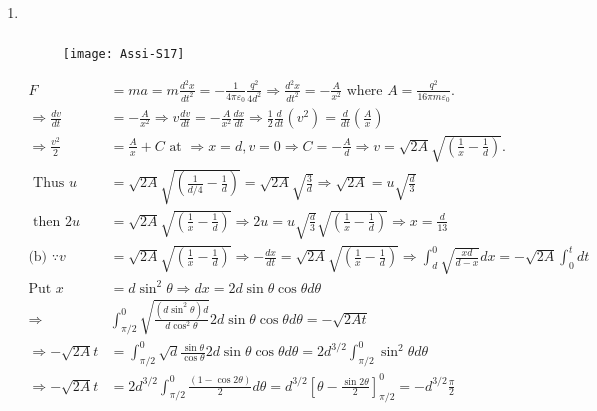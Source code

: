 \begin{enumerate}
\begin{answer}
	\end{answer}
	\item $\left. \right. $
	\begin{answer}$\left. \right. $
			\begin{figure}[H]
			\centering
			\texttt{[image: Assi-S17]}
		\end{figure}
		\begin{align*}
	F&=m a=m \frac{d^{2} x}{d t^{2}}=-\frac{1}{4 \pi \varepsilon_{0}} \frac{q^{2}}{4 d^{2}} \Rightarrow \frac{d^{2} x}{d t^{2}}=-\frac{A}{x^{2}}\text{ where }A=\frac{q^{2}}{16 \pi m \varepsilon_{0}}.\\
		\Rightarrow \frac{d v}{d t}&=-\frac{A}{x^{2}} \Rightarrow v \frac{d v}{d t}=-\frac{A}{x^{2}} \frac{d x}{d t} \Rightarrow \frac{1}{2} \frac{d}{d t}\left(v^{2}\right)=\frac{d}{d t}\left(\frac{A}{x}\right) \\
		\Rightarrow \frac{v^{2}}{2}&=\frac{A}{x}+C \text { at } \Rightarrow x=d, v=0 \Rightarrow C=-\frac{A}{d} \Rightarrow v=\sqrt{2 A} \sqrt{\left(\frac{1}{x}-\frac{1}{d}\right)} . \\
		\text { Thus } u&=\sqrt{2 A} \sqrt{\left(\frac{1}{d / 4}-\frac{1}{d}\right)}=\sqrt{2 A} \sqrt{\frac{3}{d}} \Rightarrow \sqrt{2 A}=u \sqrt{\frac{d}{3}} \\
		\text { then } 2 u&=\sqrt{2 A} \sqrt{\left(\frac{1}{x}-\frac{1}{d}\right)} \Rightarrow 2 u=u \sqrt{\frac{d}{3}} \sqrt{\left(\frac{1}{x}-\frac{1}{d}\right)} \Rightarrow x=\frac{d}{13}\\
		\text{(b) }\because v&=\sqrt{2 A} \sqrt{\left(\frac{1}{x}-\frac{1}{d}\right)} \Rightarrow-\frac{d x}{d t}=\sqrt{2 A} \sqrt{\left(\frac{1}{x}-\frac{1}{d}\right)} \Rightarrow \int_{d}^{0} \sqrt{\frac{x d}{d-x}} d x=-\sqrt{2 A} \int_{0}^{t} d t\\
		\text{Put }x&=d \sin ^{2} \theta \Rightarrow d x=2 d \sin \theta \cos \theta d \theta\\
		\Rightarrow& \int_{\pi / 2}^{0} \sqrt{\frac{\left(d \sin ^{2} \theta\right) d}{d \cos ^{2} \theta}} 2 d \sin \theta \cos \theta d \theta=-\sqrt{2 A t} \\
		\Rightarrow-\sqrt{2 A} t&=\int_{\pi / 2}^{0} \sqrt{d} \frac{\sin \theta}{\cos \theta} 2 d \sin \theta \cos \theta d \theta=2 d^{3 / 2} \int_{\pi / 2}^{0} \sin ^{2} \theta d \theta \\
		\Rightarrow-\sqrt{2 A} t&=2 d^{3 / 2} \int_{\pi / 2}^{0} \frac{(1-\cos 2 \theta)}{2} d \theta=d^{3 / 2}\left[\theta-\frac{\sin 2 \theta}{2}\right]_{\pi / 2}^{0}=-d^{3 / 2} \frac{\pi}{2} \\

\end{align*}
\end{answer}
\end{enumerate}
